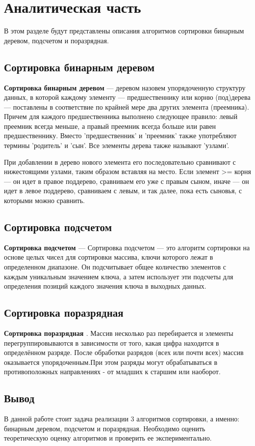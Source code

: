 \chapter{Аналитическая часть}

В этом разделе будут представлены описания алгоритмов сортировки бинарным деревом, подсчетом и поразрядная.


\section{Сортировка бинарным деревом}

\textbf{Сортировка бинарным деревом} \cite{binary} --- деревом назовем упорядоченную структуру данных, в которой каждому элементу --- предшественнику или корню (под)дерева --- поставлены в соответствие по крайней мере два других элемента (преемника). 
Причем для каждого предшественника выполнено следующее правило: левый преемник всегда меньше, а правый преемник всегда больше или равен предшественнику.  
Вместо 'предшественник' и 'преемник' также употребляют термины 'родитель' и 'сын'. Все элементы дерева также называют 'узлами'.

При добавлении в дерево нового элемента его последовательно сравнивают с нижестоящими узлами, таким образом вставляя на место.
Если элемент >= корня --- он идет в правое поддерево, сравниваем его уже с правым сыном, иначе --- он идет в левое поддерево, сравниваем с левым, и так далее, пока есть сыновья, с которыми можно сравнить.


\section{Сортировка подсчетом}

\textbf{Сортировка подсчетом \cite{counting_sort}} --- Сортировка подсчетом — это алгоритм сортировки на основе целых чисел для сортировки массива, ключи которого лежат в определенном диапазоне. Он подсчитывает общее количество элементов с каждым уникальным значением ключа, а затем использует эти подсчеты для определения позиций каждого значения ключа в выходных данных.

\section{Сортировка поразрядная}

\textbf{Сортировка поразрядная \cite{radix_sort}}. Массив несколько раз перебирается и элементы перегруппировываются в зависимости от того, какая цифра находится в определённом разряде. После обработки разрядов (всех или почти всех) массив оказывается упорядоченным.При этом разряды могут обрабатываться в противоположных направлениях - от младших к старшим или наоборот.



\section*{Вывод}

В данной работе стоит задача реализации 3 алгоритмов сортировки, а
именно: бинарным деревом, подсчетом и поразрядная. Необходимо оценить теоретическую оценку алгоритмов и проверить ее экспериментально.

